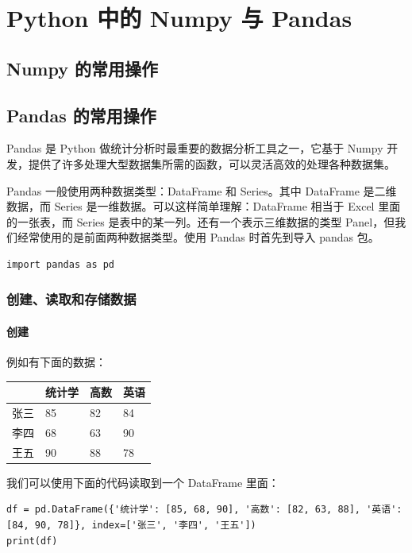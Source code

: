\chapter{Python 中的 Numpy 与 Pandas}

\section{Numpy 的常用操作}

\clearpage
\section{Pandas 的常用操作}

Pandas 是 Python 做统计分析时最重要的数据分析工具之一，它基于 Numpy 开发，提供了许多处理大型数据集所需的函数，可以灵活高效的处理各种数据集。

Pandas 一般使用两种数据类型：DataFrame 和 Series。其中 DataFrame 是二维数据，而 Series 是一维数据。可以这样简单理解：DataFrame 相当于 Excel 里面的一张表，而 Series 是表中的某一列。还有一个表示三维数据的类型 Panel，但我们经常使用的是前面两种数据类型。使用 Pandas 时首先到导入 pandas 包。

\begin{lstlisting}[Language=Python]
import pandas as pd
\end{lstlisting}

\subsection{创建、读取和存储数据}

\subsubsection{创建}
 例如有下面的数据：

 \begin{table}[!ht]
 \centering
 \renewcommand{\arraystretch}{1.2}
 \begin{tabular}{|l|l|l|l|}
 \hline
 &统计学 & 高数 & 英语 \\ \hline
 张三 & 85 & 82 & 84 \\ \hline
 李四 & 68 & 63 & 90 \\ \hline
 王五 & 90 & 88 & 78 \\ \hline
 \end{tabular}
 \end{table}

我们可以使用下面的代码读取到一个 DataFrame 里面：

\begin{lstlisting}[Language=Python]
df = pd.DataFrame({'统计学': [85, 68, 90], '高数': [82, 63, 88], '英语': [84, 90, 78]}, index=['张三', '李四', '王五'])
print(df)
\end{lstlisting}

